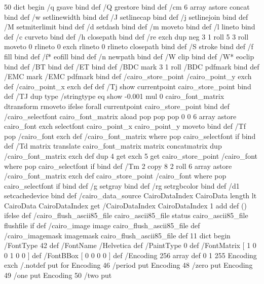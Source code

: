 50 dict begin
/q { gsave } bind def
/Q { grestore } bind def
/cm { 6 array astore concat } bind def
/w { setlinewidth } bind def
/J { setlinecap } bind def
/j { setlinejoin } bind def
/M { setmiterlimit } bind def
/d { setdash } bind def
/m { moveto } bind def
/l { lineto } bind def
/c { curveto } bind def
/h { closepath } bind def
/re { exch dup neg 3 1 roll 5 3 roll moveto 0 rlineto
      0 exch rlineto 0 rlineto closepath } bind def
/S { stroke } bind def
/f { fill } bind def
/f* { eofill } bind def
/n { newpath } bind def
/W { clip } bind def
/W* { eoclip } bind def
/BT { } bind def
/ET { } bind def
/BDC { mark 3 1 roll /BDC pdfmark } bind def
/EMC { mark /EMC pdfmark } bind def
/cairo_store_point { /cairo_point_y exch def /cairo_point_x exch def } def
/Tj { show currentpoint cairo_store_point } bind def
/TJ {
  {
    dup
    type /stringtype eq
    { show } { -0.001 mul 0 cairo_font_matrix dtransform rmoveto } ifelse
  } forall
  currentpoint cairo_store_point
} bind def
/cairo_selectfont { cairo_font_matrix aload pop pop pop 0 0 6 array astore
    cairo_font exch selectfont cairo_point_x cairo_point_y moveto } bind def
/Tf { pop /cairo_font exch def /cairo_font_matrix where
      { pop cairo_selectfont } if } bind def
/Td { matrix translate cairo_font_matrix matrix concatmatrix dup
      /cairo_font_matrix exch def dup 4 get exch 5 get cairo_store_point
      /cairo_font where { pop cairo_selectfont } if } bind def
/Tm { 2 copy 8 2 roll 6 array astore /cairo_font_matrix exch def
      cairo_store_point /cairo_font where { pop cairo_selectfont } if } bind def
/g { setgray } bind def
/rg { setrgbcolor } bind def
/d1 { setcachedevice } bind def
/cairo_data_source {
  CairoDataIndex CairoData length lt
    { CairoData CairoDataIndex get /CairoDataIndex CairoDataIndex 1 add def }
    { () } ifelse
} def
/cairo_flush_ascii85_file { cairo_ascii85_file status { cairo_ascii85_file flushfile } if } def
/cairo_image { image cairo_flush_ascii85_file } def
/cairo_imagemask { imagemask cairo_flush_ascii85_file } def
11 dict begin
/FontType 42 def
/FontName /Helvetica def
/PaintType 0 def
/FontMatrix [ 1 0 0 1 0 0 ] def
/FontBBox [ 0 0 0 0 ] def
/Encoding 256 array def
0 1 255 { Encoding exch /.notdef put } for
Encoding 46 /period put
Encoding 48 /zero put
Encoding 49 /one put
Encoding 50 /two put
